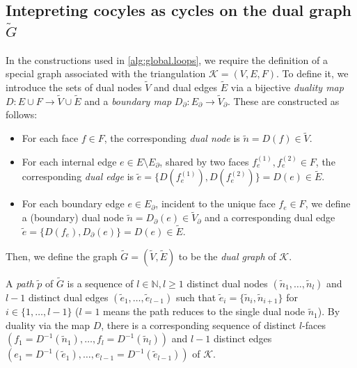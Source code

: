 \documentclass[a4paper,twoside,10pt]{article}
\theoremstyle{plain}
\theoremstyle{definition}
\theoremstyle{remark}
\newcommand{\mc}{\mathcal}
\newcommand{\N}{\mathbb{N}}
\newcommand{\K}{\mc{K}}
\newcommand{\dual}[1]{\tilde{#1}}
\begin{document}
\subsection{Intepreting cocyles as cycles on the dual graph $\dual G$}
In the constructions used in \cref{alg:global.loops}, we require the definition of a special graph associated with the triangulation $\K=(V,E,F)$.
To define it, we introduce the sets of dual nodes $\dual V$ and dual edges $\dual E$ via a bijective \emph{duality map} $D: E \cup F \to \dual V \cup \dual E$ and a \emph{boundary map} $D_\partial: E_\partial \to \dual V_\partial$.
These are constructed as follows:
\begin{itemize}
    \item For each face $f \in F$, the corresponding \emph{dual node} is $\dual n = D(f) \in \dual V$.
\item For each internal edge $e \in E \setminus E_\partial$, shared by two faces $f_e^{(1)}, f_e^{(2)} \in F$, the corresponding \emph{dual edge} is $\dual e = \{D(f_e^{(1)}), D(f_e^{(2)})\} = D(e) \in \dual E$.
    \item For each boundary edge $e \in E_\partial$, incident to the unique face $f_e \in F$, we define a (boundary) dual node $\dual n = D_\partial(e) \in \dual V_\partial$ and a corresponding dual edge $\dual e = \{D(f_e), D_\partial(e)\} = D(e) \in \dual E$.
\end{itemize}
Then, we define the graph $\dual G = (\dual V, \dual E)$ to be the \emph{dual graph} of $\K$.

A \emph{path} $\dual p$ of $\dual G$ is a sequence of $l \in \N, l \geq 1$ distinct dual nodes $(\dual n_1, \dots, \dual n_l)$ and $l-1$ distinct dual edges $(\dual e_1, \dots, \dual e_{l-1})$ such that $\dual e_i=\{\dual n_{i}, \dual n_{i+1}\}$ for $i \in \{1, \dots, l-1\}$ ($l=1$ means the path reduces to the single dual node $\dual n_1$).
By duality via the map $D$, there is a corresponding sequence of distinct $l$-faces  $(f_1=D^{-1}(\dual n_1),\dots, f_l = D^{-1}(\dual n_l))$ and $l-1$ distinct edges $(e_1=D^{-1}(\dual e_1), \dots, e_{l-1} = D^{-1}(\dual e_{l-1}))$ of $\K$.
\end{document}
